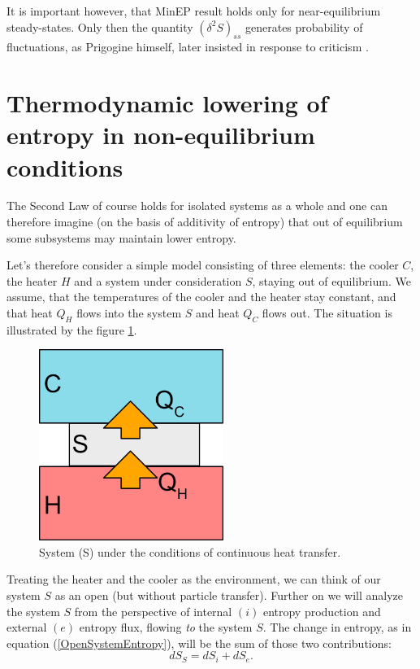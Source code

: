 \documentclass[a4paper,12pt]{article}
\begin{document}
It is important however, that MinEP result holds only for near-equilibrium steady-states. Only then the quantity $ (\delta^2 S)_{ss} $ generates probability of fluctuations, as Prigogine himself, later insisted in response to criticism \cite{Nicolis:1979cv}.


\section{Thermodynamic lowering of entropy in non-equilibrium conditions}
\label{simple-model}

The Second Law of course holds for isolated systems as a whole and one can therefore imagine (on the basis of additivity of entropy) that out of equilibrium some subsystems may maintain lower entropy.

Let's therefore consider a simple model consisting of three elements: the cooler $C$, the heater $H$ and a system under consideration $S$, staying out of equilibrium.
We assume, that the temperatures of the cooler and the heater stay constant, and that heat $Q_H$ flows into the system $S$ and heat $Q_C$ flows out. The situation is illustrated by the figure \ref{Fig2}.
\begin{figure}[ht!]
\centering \includegraphics[width=6cm]{system} \caption{System (S) under the conditions of continuous heat transfer.}
\label{Fig2} 
\end{figure}
Treating the heater and the cooler as the environment, we can think of our system $S$ as an open (but without particle transfer).
Further on we will analyze the system $S$ from the perspective of internal $(i)$ entropy production and external $(e)$ entropy flux, flowing \emph{to} the system $S$. 
The change in entropy, as in equation (\ref{OpenSystemEntropy}), will be the sum of those two contributions:
\begin{equation}
dS_S=dS_i+dS_e.
\label{entrosum}
\end{equation}
\end{document}
